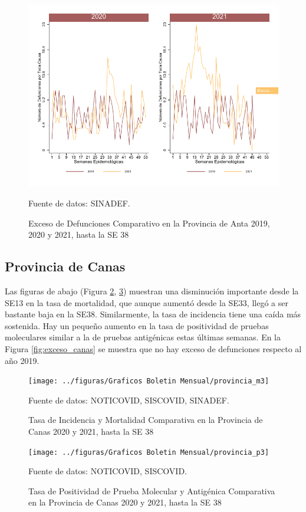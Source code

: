 \documentclass[12pt,a4paper,openany]{book}
\begin{document}
	\begin{figure}[h]
		\caption{Exceso de Defunciones Comparativo en la Provincia de Anta 2019, 2020 y 2021, hasta la SE 38}\label{fig:exceso_anta}
		\begin{center}
			\includegraphics[width=0.7\linewidth]{../figuras/exceso_2}
		\end{center}
		{\footnotesize {Fuente de datos: SINADEF.}}
	\end{figure}

		\clearpage
	
	\subsection*{Provincia de Canas}
	\noindent Las figuras de abajo (Figura \ref{fig:inc_mort_canas}, \ref{fig:positividad_canas})  muestran una disminución importante desde la SE13 en la tasa de mortalidad, que aunque aumentó desde la SE33, llegó a ser bastante baja en la SE38. Similarmente, la tasa de incidencia tiene una caída más sostenida. Hay un pequeño aumento en la tasa de positividad de pruebas moleculares similar a la de pruebas antigénicas estas últimas semanas. En la Figura \ref{fig:exceso_canas} se muestra que no hay exceso de defunciones respecto al año 2019.
	
	\begin{figure}[h]
		\caption{Tasa de Incidencia y Mortalidad Comparativa en la Provincia de Canas 2020 y 2021, hasta la SE 38}\label{fig:inc_mort_canas}
		\begin{center}
			\texttt{[image: ../figuras/Graficos Boletin Mensual/provincia\_m3]}
		\end{center}
		{\footnotesize {Fuente de datos: NOTICOVID, SISCOVID, SINADEF.}}
	\end{figure}
	
	\begin{figure}[h]
		\caption{Tasa de Positividad de Prueba Molecular y Antigénica Comparativa en la Provincia de Canas 2020 y 2021, hasta la SE 38}\label{fig:positividad_canas}
		\begin{center}
			\texttt{[image: ../figuras/Graficos Boletin Mensual/provincia\_p3]}
		\end{center}
		{\footnotesize {Fuente de datos: NOTICOVID, SISCOVID.}}
	\end{figure}
	
\end{document}
